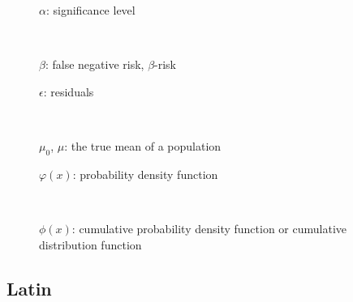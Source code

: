 \documentclass[
  a4paper,
]{scrbook}
\begin{document}
\begin{figure}

\begin{minipage}{0.47\linewidth}
\label{sign-level}{\(\alpha\)}: significance
level\end{minipage}%
%
\begin{minipage}{0.05\linewidth}
~\end{minipage}%
%
\begin{minipage}{0.47\linewidth}
\label{beta-risk}{\(\beta\)}: false negative risk,
\(\beta\)-risk\end{minipage}%
\newline
\begin{minipage}{0.47\linewidth}
\label{epsilon}{\(\epsilon\)}: residuals\end{minipage}%
%
\begin{minipage}{0.05\linewidth}
~\end{minipage}%
%
\begin{minipage}{0.47\linewidth}
\label{truemean-gloss}{\(\mu_0\), \(\mu\)}: the true mean
of a population\end{minipage}%
\newline
\begin{minipage}{0.47\linewidth}
\label{pdf-gloss}{\(\varphi(x)\)}: probability density
function\end{minipage}%
%
\begin{minipage}{0.05\linewidth}
~\end{minipage}%
%
\begin{minipage}{0.47\linewidth}
\label{cdf-gloss}{\(\phi(x)\)}: cumulative probability
density function or cumulative distribution function\end{minipage}%

\end{figure}%

\subsection*{Latin}\label{latin}
\end{document}
